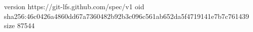 version https://git-lfs.github.com/spec/v1
oid sha256:46c0426a4860dd67a7360482b92b3c096c561ab652da5f4719141e7b7c761439
size 87544
